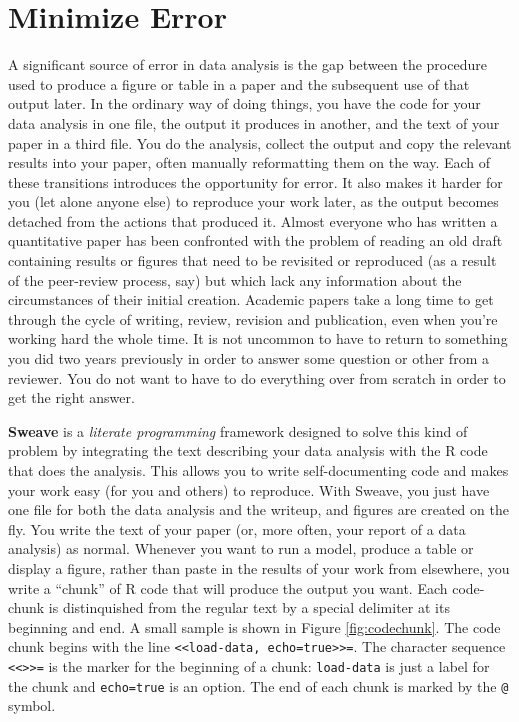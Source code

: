\documentclass[11pt,article,oneside]{memoir}
\begin{document}
\section{Minimize Error}  
A significant source of error in data analysis is the gap between the procedure used to produce a figure or table in a paper and the subsequent use of that output later. In the ordinary way of doing things, you have the code for your data analysis in one file, the output it produces in another, and the text of your paper in a third file. You do the analysis, collect the output and copy the relevant results into your paper, often manually reformatting them on the way. Each of these transitions introduces the opportunity for error. It also makes it harder for you (let alone anyone else) to reproduce your work later, as the output becomes detached from the actions that produced it. Almost everyone who has written a quantitative paper has been confronted with the problem of reading an old draft containing results or figures that need to be revisited or reproduced (as a result of the peer-review process, say) but which lack any information about the circumstances of their initial creation. Academic papers take a long time to get through the cycle of writing, review, revision and publication, even when you're working hard the whole time. It is not uncommon to have to return to something you did two years previously in order to answer some question or other from a reviewer. You do not want to have to do everything over from scratch in order to get the right answer.

\smallskip

\textbf{Sweave} is a \emph{literate programming} framework designed to solve this kind of problem by integrating the text describing your data analysis with the R code that does the analysis. This allows you to write self-documenting code and makes your work easy (for you and others) to reproduce. With Sweave, you just have one file for both the data analysis and the writeup, and figures are created on the fly. You write the text of your paper (or, more often, your report of a data analysis) as normal. Whenever you want to run a model, produce a table or display a figure, rather than paste in the results of your work from elsewhere, you write a ``chunk'' of R code that will produce the output you want. Each code-chunk is distinquished from the regular text by a special delimiter at its beginning and end. A small sample is shown in Figure \ref{fig:codechunk}. The code chunk begins with the line \lstinline!<<load-data, echo=true>>=!. The character sequence \lstinline!<<>>=! is the marker for the beginning of a chunk: \lstinline!load-data! is just a label for the chunk and \lstinline!echo=true! is an option. The end of each chunk is marked by the \lstinline!@! symbol.
\end{document}

